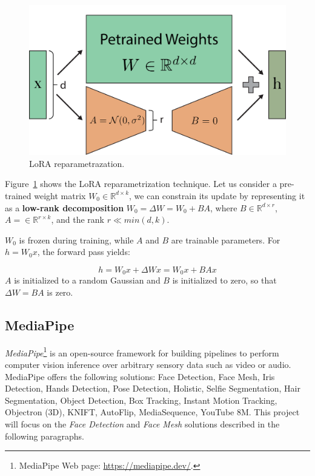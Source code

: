 \documentclass[sn-mathphys,Numbered]{sn-jnl}
\theoremstyle{thmstyleone}%
\theoremstyle{thmstyletwo}%
\theoremstyle{thmstylethree}%
\begin{document}
\begin{figure}[t]
	\centering
    \includegraphics[scale=0.62]{img/svg/LoRA.png}
	\caption{LoRA reparametrazation.}\label{fig:lora}
\end{figure}


Figure~\ref{fig:lora} shows the LoRA reparametrization technique. Let us consider a  pre-trained weight matrix $W_0 \in \mathbb{R}^{d\times k}$, we can constrain its update by representing it as a \textbf{low-rank decomposition} $W_0 = \Delta W=W_0+BA$, where $B \in \mathbb{R}^{d \times r}$, $A= \in \mathbb{R}^{r \times k}$, and the rank $r \ll min(d,k)$.

$W_0$ is frozen during training, while $A$ and $B$ are trainable parameters.
For $h = W_0x$, the forward pass yields:

\begin{equation}
	h = W_0x + \Delta Wx = W_0x + BAx
\end{equation}
$A$ is initialized to a random Gaussian and $B$ is initialized to zero, so that
$\Delta W = BA$ is zero.



\subsection{MediaPipe}\label{sect:mediapipe}

\emph{MediaPipe}\footnote{MediaPipe Web page: \url{https://mediapipe.dev/}.}  is an open-source framework for building pipelines to perform computer vision  inference over arbitrary sensory data such as video or audio. MediaPipe offers the following solutions:
Face Detection, Face Mesh,  Iris Detection, Hands Detection, Pose Detection, Holistic, Selfie Segmentation, Hair Segmentation, Object Detection, Box Tracking, Instant Motion Tracking, Objectron (3D), KNIFT, AutoFlip, MediaSequence, YouTube 8M. This project will focus on the \emph{Face Detection} and \emph{Face Mesh} solutions described in the following paragraphs.
\end{document}
